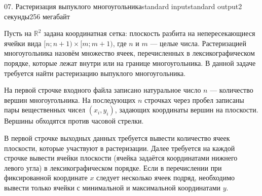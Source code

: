 \begin{problem}{07. Растеризация выпуклого многоугольника}{standard input}{standard output}{2 секунды}{256 мегабайт}

Пусть на $\mathbb R^2$ задана координатная сетка: плоскость разбита на непересекающиеся ячейки вида $[n; n + 1) \times [m; m + 1)$, где $n$ и $m$ --- целые числа. Растеризацией многоугольника назовём множество ячеек, перечисленных в лексикографическом порядке, которые лежат внутри или на границе многоугольника. В данной задаче требуется найти растеризацию выпуклого многоугольника.

\InputFile

На первой строчке входного файла записано натуральное число $n$ --- количество вершин многоугольника. На последующих $n$ строчках через пробел записаны пары вещественных чисел $(x_i, y_i)$, задающих координаты вершин на плоскости. Вершины обходятся против часовой стрелки.

\OutputFile

В первой строчке выходных данных требуется вывести количество ячеек плоскости, которые участвуют в растеризации. Далее требуется на каждой строчке вывести ячейки плоскости (ячейка задаётся координатами нижнего левого угла) в лексикографическом порядке. Если в перечислении при фиксированной координате $x$ следует несколько ячеек подряд, необходимо вывести только ячейки с минимальной и максимальной координатами $y$.

\Examples

\begin{example}%
%
\end{example}

\end{problem}
